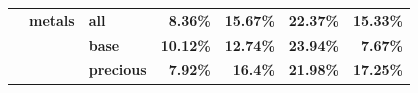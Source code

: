 \documentclass[
  authoryear,
  preprint,
  3p]{elsarticle}
\begin{document}
\begin{longtable}[t]{>{}l>{}l>{}l>{}r>{}r>{}r>{}r}
\textbf{} & \textbf{metals} & \textbf{all} & \textcolor[HTML]{4285f4}{\textbf{8.36\%}} & \textcolor[HTML]{4285f4}{\textbf{15.67\%}} & \textcolor[HTML]{4285f4}{\textbf{22.37\%}} & \textcolor[HTML]{4285f4}{\textbf{15.33\%}}\\
\addlinespace
\textbf{} & \textbf{} & \textbf{base} & \textcolor[HTML]{4285f4}{\textbf{10.12\%}} & \textcolor[HTML]{4285f4}{\textbf{12.74\%}} & \textcolor[HTML]{4285f4}{\textbf{23.94\%}} & \textcolor[HTML]{4285f4}{\textbf{7.67\%}}\\
\textbf{} & \textbf{} & \textbf{precious} & \textcolor[HTML]{4285f4}{\textbf{7.92\%}} & \textcolor[HTML]{4285f4}{\textbf{16.4\%}} & \textcolor[HTML]{4285f4}{\textbf{21.98\%}} & \textcolor[HTML]{4285f4}{\textbf{17.25\%}}\\
\bottomrule

\end{longtable}

\endgroup{}

\newpage

\begingroup\fontsize{7}{9}\selectfont
\end{document}
